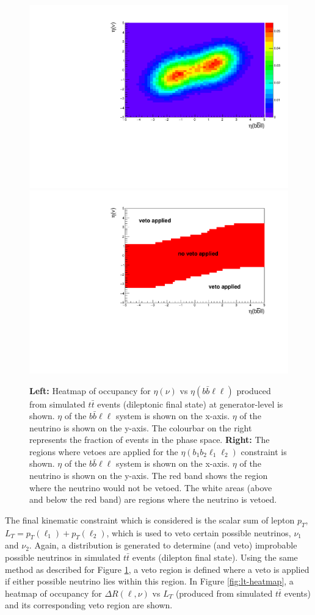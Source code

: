  \begin{figure}[h!]
	\includegraphics[width=0.45\linewidth]{figures/bbll_occ_2vSM.pdf}
		\includegraphics[width=0.45\linewidth]{figures/bbll_veto_2vSM.pdf}
	\centering
	\caption{\textbf{Left: }Heatmap of occupancy for $\eta (\nu)$ vs $\eta(b\bar{b}\ell\ell)$ produced from simulated $t\bar{t}$ events (dileptonic final state) at generator-level is shown. $\eta$ of the $b\bar{b}\ell\ell$ system is shown on the x-axis. $\eta$ of the neutrino is shown on the y-axis. The colourbar on the right represents the fraction of events in the phase space. \textbf{Right: } The regions where vetoes are applied for the $\eta(b_{1}b_{2}\ell_{1}\ell_{2})$ constraint is shown. $\eta$ of the $b\bar{b}\ell\ell$ system is shown on the x-axis. $\eta$ of the neutrino is shown on the y-axis. The red band shows the region where the neutrino would not be vetoed. The white areas (above and below the red band) are regions where the neutrino is vetoed.}
	\label{fig:eta-bbll-heatmap}
\end{figure}


The final kinematic constraint which is considered is the scalar sum of lepton $p_{T}$, $L_{T} = p_{T}(\ell_{1}) + p_{T}(\ell_{2})$, which is used to veto certain possible neutrinos, $\nu_{1}$ and $\nu_{2}$. Again, a distribution is generated to determine (and veto) improbable possible neutrinos in simulated $t\bar{t}$ events (dilepton final state). Using the same method as described for Figure \ref{fig:eta-bbll-heatmap}, a veto region is defined where a veto is applied if either possible neutrino lies within this region. In Figure \ref{fig:lt-heatmap}, a heatmap of occupancy for $\Delta R (\ell, \nu)$ vs $L_{T}$ (produced from simulated $t\bar{t}$ events) and its corresponding veto region are shown.


